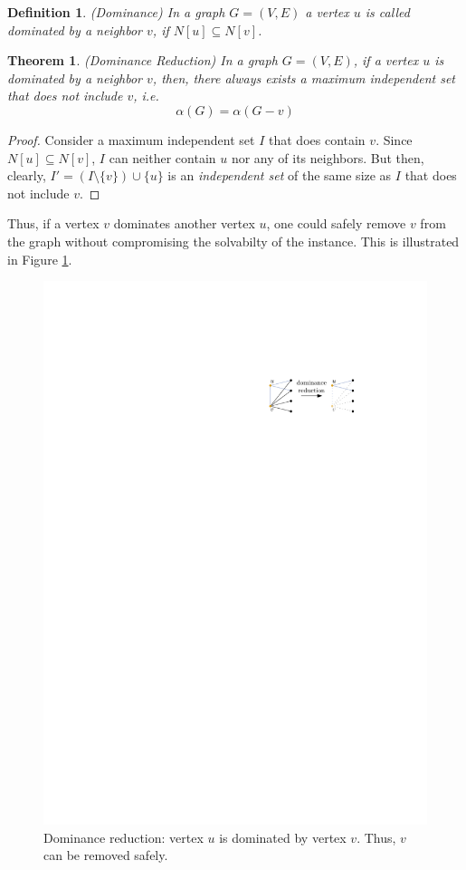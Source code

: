 \documentclass[12pt,a4paper,twoside]{scrartcl}
\newtheorem{theorem}{Theorem}
\newtheorem{definition}{Definition}
\numberwithin{equation}{section}
\begin{document}
\begin{definition} (Dominance)
	In a graph $G=(V,E)$ a vertex $u$ is called dominated by a neighbor $v$, if $N[u]\subseteq N[v]$.
\end{definition}


\begin{theorem} (Dominance Reduction) In a graph $G=(V,E)$, if a vertex $u$ is dominated by a neighbor $v$, then, there always exists a maximum independent set that does not include $v$, i.e.\[\alpha(G)=\alpha(G-v)\]
\end{theorem}
\begin{proof}
	Consider a maximum independent set $I$ that does contain $v$. Since $N[u]\subseteq N[v]$, $I$ can neither contain $u$ nor any of its neighbors. But then, clearly, $I' = (I\setminus\{v\})\cup\{u\}$ is an \textit{independent set} of the same size as $I$ that does not include $v$.
\end{proof}
Thus, if a vertex $v$ dominates another vertex $u$, one could safely remove $v$ from the graph without compromising the solvabilty of the instance. This is illustrated in Figure \ref{fig:dom_red}.\\

\begin{figure}[htb]
	\captionsetup{belowskip=-1em}
	\includegraphics[scale=1.5]{images/dom_red}
	\centering
	\caption{Dominance reduction: vertex $u$ is dominated by vertex $v$. Thus, $v$ can be removed safely.}
	\label{fig:dom_red}
\end{figure}
\end{document}
